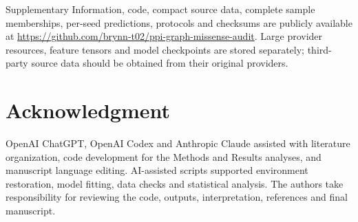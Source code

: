 \documentclass[conference]{IEEEtran}
\begin{document}
Supplementary Information, code, compact source data, complete sample memberships, per-seed predictions, protocols and checksums are publicly available at \url{https://github.com/brynn-t02/ppi-graph-missense-audit}. Large provider resources, feature tensors and model checkpoints are stored separately; third-party source data should be obtained from their original providers.

\section*{Acknowledgment}

OpenAI ChatGPT, OpenAI Codex and Anthropic Claude assisted with literature organization, code development for the Methods and Results analyses, and manuscript language editing. AI-assisted scripts supported environment restoration, model fitting, data checks and statistical analysis. The authors take responsibility for reviewing the code, outputs, interpretation, references and final manuscript.
\end{document}
